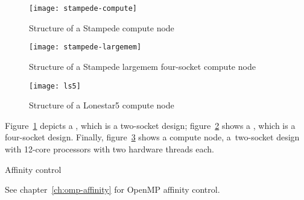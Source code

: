 \begin{figure}[ht]
  \texttt{[image: stampede-compute]}
  \caption{Structure of a Stampede compute node}
  \label{fig:stampede-compute-hwloc}
\end{figure}

\begin{figure}[p]
  \texttt{[image: stampede-largemem]}
  \caption{Structure of a Stampede largemem four-socket compute node}
  \label{fig:stampede-largemem-hwloc}
\end{figure}

\begin{figure}[ht]
  \texttt{[image: ls5]}
  \caption{Structure of a Lonestar5 compute node}
  \label{fig:ls5-compute-hwloc}
\end{figure}

Figure~\ref{fig:stampede-compute-hwloc} depicts a
, which is a two-socket
 design;
figure~\ref{fig:stampede-largemem-hwloc} shows a 
, which is a four-socket design.
%
Finally, figure~\ref{fig:ls5-compute-hwloc} shows a
 compute node, a~two-socket design with 12-core
 processors with two hardware threads
each.

 {Affinity control}

See chapter~\ref{ch:omp-affinity} for OpenMP affinity control.

